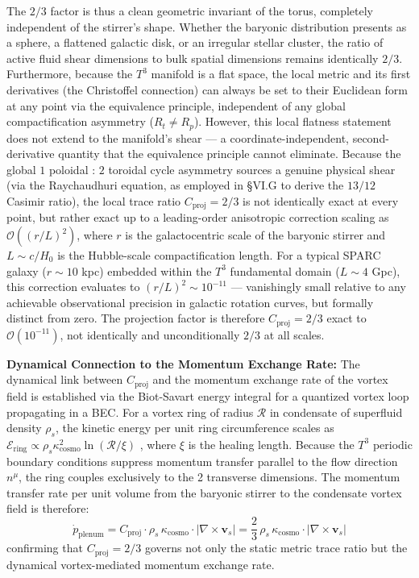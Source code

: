 \documentclass[aps,prd,10pt,twocolumn,superscriptaddress,nofootinbib,floatfix]{revtex4-2}
\begin{document}
The $2/3$ factor is thus a clean geometric invariant of the torus, completely independent of the stirrer's shape. Whether the baryonic distribution presents as a sphere, a flattened galactic disk, or an irregular stellar cluster, the ratio of active fluid shear dimensions to bulk spatial dimensions remains identically $2/3$. Furthermore, because the $T^3$ manifold is a flat space, the local metric and its first derivatives (the Christoffel connection) can always be set to their Euclidean form at any point via the equivalence principle, independent of any global compactification asymmetry ($R_t \neq R_p$). However, this local flatness statement does not extend to the manifold's shear — a coordinate-independent, second-derivative quantity that the equivalence principle cannot eliminate. Because the global $1$ poloidal : $2$ toroidal cycle asymmetry sources a genuine physical shear (via the Raychaudhuri equation, as employed in \S VI.G to derive the $13/12$ Casimir ratio), the local trace ratio $C_{\text{proj}} = 2/3$ is not identically exact at every point, but rather exact up to a leading-order anisotropic correction scaling as $\mathcal{O}((r/L)^2)$, where $r$ is the galactocentric scale of the baryonic stirrer and $L \sim c/H_0$ is the Hubble-scale compactification length. For a typical SPARC galaxy ($r \sim 10$ kpc) embedded within the $T^3$ fundamental domain ($L \sim 4$ Gpc), this correction evaluates to $(r/L)^2 \sim 10^{-11}$ — vanishingly small relative to any achievable observational precision in galactic rotation curves, but formally distinct from zero. The projection factor is therefore $C_{\text{proj}} = 2/3$ exact to $\mathcal{O}(10^{-11})$, not identically and unconditionally $2/3$ at all scales.

\textbf{Dynamical Connection to the Momentum Exchange Rate:}
The dynamical link between $C_{\text{proj}}$ and the momentum exchange rate of the vortex field is established via the Biot-Savart energy integral for a quantized vortex loop propagating in a BEC. For a vortex ring of radius $\mathcal{R}$ in condensate of superfluid density $\rho_s$, the kinetic energy per unit ring circumference scales as $\mathcal{E}_{\text{ring}} \propto \rho_s \kappa_{\text{cosmo}}^2 \ln(\mathcal{R}/\xi)$ \cite{barcelo}, where $\xi$ is the healing length. Because the $T^3$ periodic boundary conditions suppress momentum transfer parallel to the flow direction $n^\mu$, the ring couples exclusively to the 2 transverse dimensions. The momentum transfer rate per unit volume from the baryonic stirrer to the condensate vortex field is therefore:
\begin{equation}
\dot{p}_{\text{plenum}} = C_{\text{proj}} \cdot \rho_s \, \kappa_{\text{cosmo}} \cdot |\nabla \times \mathbf{v}_s| = \frac{2}{3}\, \rho_s \, \kappa_{\text{cosmo}} \cdot |\nabla \times \mathbf{v}_s|
\end{equation}
confirming that $C_{\text{proj}} = 2/3$ governs not only the static metric trace ratio but the dynamical vortex-mediated momentum exchange rate.
\end{document}
